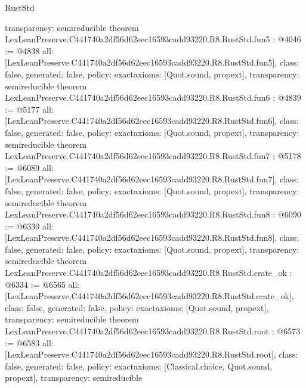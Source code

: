 \begin{lexlean}{RustStd}
\begin{coremodule}
{  transparency: semireducible
}
theorem LexLeanPreserve.C441740a2df56d62eec16593cadd93220.R8.RustStd.fun5 : @4046 := @4838 {
  all: [LexLeanPreserve.C441740a2df56d62eec16593cadd93220.R8.RustStd.fun5],
  class: false,
  generated: false,
  policy: exact{axioms: [Quot.sound, propext]},
  transparency: semireducible
}
theorem LexLeanPreserve.C441740a2df56d62eec16593cadd93220.R8.RustStd.fun6 : @4839 := @5177 {
  all: [LexLeanPreserve.C441740a2df56d62eec16593cadd93220.R8.RustStd.fun6],
  class: false,
  generated: false,
  policy: exact{axioms: [Quot.sound, propext]},
  transparency: semireducible
}
theorem LexLeanPreserve.C441740a2df56d62eec16593cadd93220.R8.RustStd.fun7 : @5178 := @6089 {
  all: [LexLeanPreserve.C441740a2df56d62eec16593cadd93220.R8.RustStd.fun7],
  class: false,
  generated: false,
  policy: exact{axioms: [Quot.sound, propext]},
  transparency: semireducible
}
theorem LexLeanPreserve.C441740a2df56d62eec16593cadd93220.R8.RustStd.fun8 : @6090 := @6330 {
  all: [LexLeanPreserve.C441740a2df56d62eec16593cadd93220.R8.RustStd.fun8],
  class: false,
  generated: false,
  policy: exact{axioms: [Quot.sound, propext]},
  transparency: semireducible
}
theorem LexLeanPreserve.C441740a2df56d62eec16593cadd93220.R8.RustStd.crate_ok : @6334 := @6565 {
  all: [LexLeanPreserve.C441740a2df56d62eec16593cadd93220.R8.RustStd.crate_ok],
  class: false,
  generated: false,
  policy: exact{axioms: [Quot.sound, propext]},
  transparency: semireducible
}
theorem LexLeanPreserve.C441740a2df56d62eec16593cadd93220.R8.RustStd.root : @6573 := @6583 {
  all: [LexLeanPreserve.C441740a2df56d62eec16593cadd93220.R8.RustStd.root],
  class: false,
  generated: false,
  policy: exact{axioms: [Classical.choice, Quot.sound, propext]},
  transparency: semireducible
}


\end{coremodule}
\end{lexlean}
